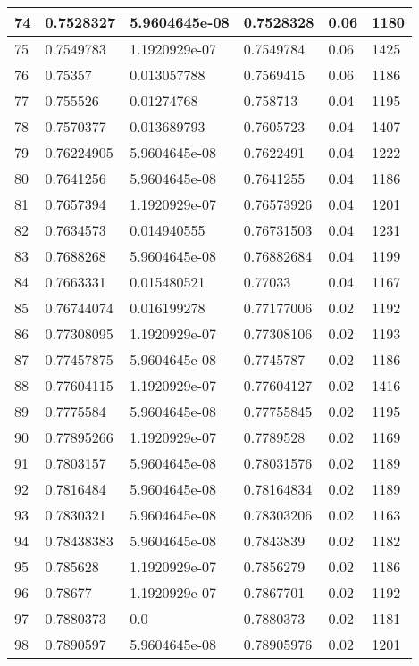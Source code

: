 \begin{longtable}{|l|l|l|l|l|l|}
74 & 0.7528327 & 5.9604645e-08 & 0.7528328 & 0.06 & 1180 \\ \hline 
75 & 0.7549783 & 1.1920929e-07 & 0.7549784 & 0.06 & 1425 \\ \hline 
76 & 0.75357 & 0.013057788 & 0.7569415 & 0.06 & 1186 \\ \hline 
77 & 0.755526 & 0.01274768 & 0.758713 & 0.04 & 1195 \\ \hline 
78 & 0.7570377 & 0.013689793 & 0.7605723 & 0.04 & 1407 \\ \hline 
79 & 0.76224905 & 5.9604645e-08 & 0.7622491 & 0.04 & 1222 \\ \hline 
80 & 0.7641256 & 5.9604645e-08 & 0.7641255 & 0.04 & 1186 \\ \hline 
81 & 0.7657394 & 1.1920929e-07 & 0.76573926 & 0.04 & 1201 \\ \hline 
82 & 0.7634573 & 0.014940555 & 0.76731503 & 0.04 & 1231 \\ \hline 
83 & 0.7688268 & 5.9604645e-08 & 0.76882684 & 0.04 & 1199 \\ \hline 
84 & 0.7663331 & 0.015480521 & 0.77033 & 0.04 & 1167 \\ \hline 
85 & 0.76744074 & 0.016199278 & 0.77177006 & 0.02 & 1192 \\ \hline 
86 & 0.77308095 & 1.1920929e-07 & 0.77308106 & 0.02 & 1193 \\ \hline 
87 & 0.77457875 & 5.9604645e-08 & 0.7745787 & 0.02 & 1186 \\ \hline 
88 & 0.77604115 & 1.1920929e-07 & 0.77604127 & 0.02 & 1416 \\ \hline 
89 & 0.7775584 & 5.9604645e-08 & 0.77755845 & 0.02 & 1195 \\ \hline 
90 & 0.77895266 & 1.1920929e-07 & 0.7789528 & 0.02 & 1169 \\ \hline 
91 & 0.7803157 & 5.9604645e-08 & 0.78031576 & 0.02 & 1189 \\ \hline 
92 & 0.7816484 & 5.9604645e-08 & 0.78164834 & 0.02 & 1189 \\ \hline 
93 & 0.7830321 & 5.9604645e-08 & 0.78303206 & 0.02 & 1163 \\ \hline 
94 & 0.78438383 & 5.9604645e-08 & 0.7843839 & 0.02 & 1182 \\ \hline 
95 & 0.785628 & 1.1920929e-07 & 0.7856279 & 0.02 & 1186 \\ \hline 
96 & 0.78677 & 1.1920929e-07 & 0.7867701 & 0.02 & 1192 \\ \hline 
97 & 0.7880373 & 0.0 & 0.7880373 & 0.02 & 1181 \\ \hline 
98 & 0.7890597 & 5.9604645e-08 & 0.78905976 & 0.02 & 1201 \\ \hline 

\end{longtable}
